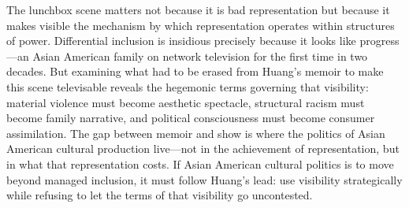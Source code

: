 \documentclass[12pt]{article}
\begin{document}
The lunchbox scene matters not because it is bad representation but because it makes visible the mechanism by which representation operates within structures of power. Differential inclusion is insidious precisely because it looks like progress---an Asian American family on network television for the first time in two decades. But examining what had to be erased from Huang's memoir to make this scene televisable reveals the hegemonic terms governing that visibility: material violence must become aesthetic spectacle, structural racism must become family narrative, and political consciousness must become consumer assimilation. The gap between memoir and show is where the politics of Asian American cultural production live---not in the achievement of representation, but in what that representation costs. If Asian American cultural politics is to move beyond managed inclusion, it must follow Huang's lead: use visibility strategically while refusing to let the terms of that visibility go uncontested.
\end{document}
